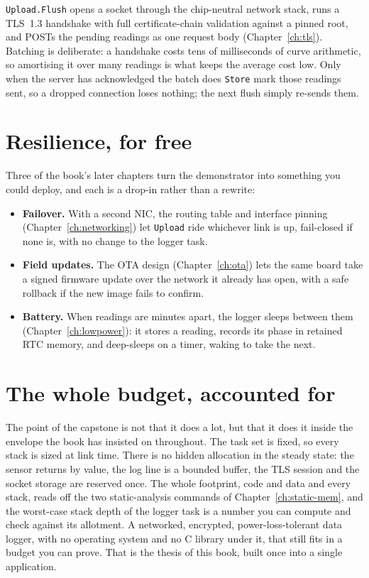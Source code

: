 \texttt{Upload.Flush} opens a socket through the chip-neutral network stack, runs a
TLS~1.3 handshake with full certificate-chain validation against a pinned root, and
POSTs the pending readings as one request body (Chapter~\ref{ch:tls}). Batching is
deliberate: a handshake costs tens of milliseconds of curve arithmetic, so amortising
it over many readings is what keeps the average cost low. Only when the server has
acknowledged the batch does \texttt{Store} mark those readings sent, so a dropped
connection loses nothing; the next flush simply re-sends them.

\section{Resilience, for free}

Three of the book's later chapters turn the demonstrator into something you could
deploy, and each is a drop-in rather than a rewrite:

\begin{itemize}
\item \textbf{Failover.} With a second NIC, the routing table and interface pinning
  (Chapter~\ref{ch:networking}) let \texttt{Upload} ride whichever link is up,
  fail-closed if none is, with no change to the logger task.
\item \textbf{Field updates.} The OTA design (Chapter~\ref{ch:ota}) lets the same
  board take a signed firmware update over the network it already has open, with a
  safe rollback if the new image fails to confirm.
\item \textbf{Battery.} When readings are minutes apart, the logger sleeps between
  them (Chapter~\ref{ch:lowpower}): it stores a reading, records its phase in
  retained RTC memory, and deep-sleeps on a timer, waking to take the next.
\end{itemize}

\section{The whole budget, accounted for}

The point of the capstone is not that it does a lot, but that it does it inside the
envelope the book has insisted on throughout. The task set is fixed, so every stack
is sized at link time. There is no hidden allocation in the steady state: the sensor
returns by value, the log line is a bounded buffer, the TLS session and the socket
storage are reserved once. The whole footprint, code and data and every stack, reads
off the two static-analysis commands of Chapter~\ref{ch:static-mem}, and the
worst-case stack depth of the logger task is a number you can compute and check
against its allotment. A networked, encrypted, power-loss-tolerant data logger, with
no operating system and no C library under it, that still fits in a budget you can
prove. That is the thesis of this book, built once into a single application.
